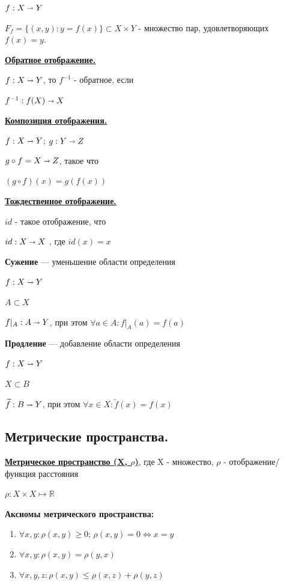 \documentclass{article}
\newcommand{\deff}[1]{\underline{\textbf{#1}}}
\begin{document}
$f: X\shortrightarrow Y $ 

$F_f = \{(x,y) : y=f(x)\} \subset X \times Y$ - множество пар, удовлетворяющих $f(x)=y$.



\deff{Обратное отображение.}

$f: X \shortrightarrow Y$, то $f^{-1}$ - обратное, если

$f^{-1}: f(X) \shortrightarrow X$

\deff{Композиция отображения.}

$f: X \shortrightarrow Y$; $g: Y \shortrightarrow Z$

$g \circ f = X \shortrightarrow Z$, такое что

$(g \circ f)(x)=g(f(x))$

\deff{Тождественное отображение.}

$id$ - такое отображение, что

$id: X \shortrightarrow X$ , где $id(x)=x$

\textbf{Сужение} --- уменьшение области определения

$f: X \shortrightarrow Y$

$A \subset X$

$f|_A:A \shortrightarrow Y$, при этом $\forall a \in A:f|_A(a)=f(a)$


\textbf{Продление} --- добавление области определения

$f:X \shortrightarrow Y$

$X \subset B$

$\widetilde{f}: B \shortrightarrow Y$, при этом $\forall x \in X: \widetilde{f}(x)=f(x) $

\pagebreak
\subsection{Метрические пространства.}

\deff{Метрическое пространство (X, $\rho$)}, где  X - множество, $\rho$ - отображение/функция расстояния

$\rho: X \times X \mapsto \mathds{R}$ 

\textbf{Аксиомы метрического пространства:}
\begin{enumerate}
    \item $\forall x,y: \rho(x,y) \geq 0$; $\rho(x,y)=0 \Leftrightarrow x=y$

    \item $\forall x,y: \rho(x,y)=\rho(y,x)$

    \item $\forall x,y,z: \rho(x,y)\leq \rho(x,z) + \rho(y,z)$
\end{enumerate}
\end{document}
